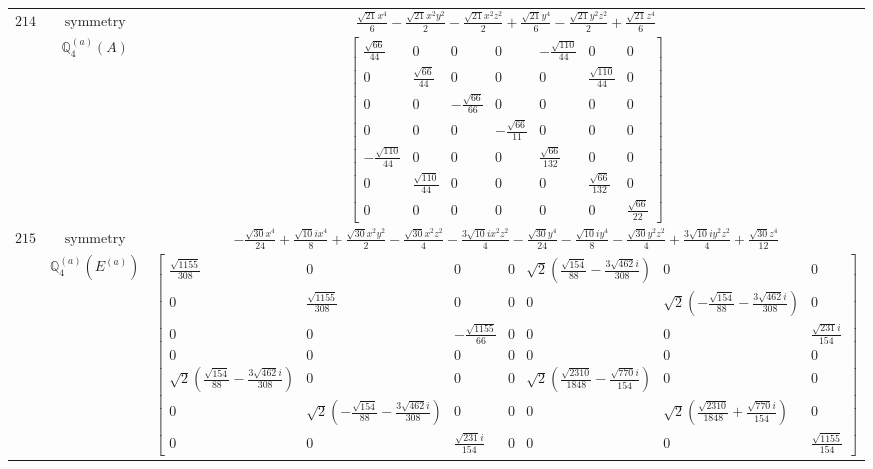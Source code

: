 \documentclass[fleqn,8pt,landscape]{jsarticle}
\begin{document}
\begin{longtable}{ccc}
$ 214 $ & $ \text{symmetry} $ & $ \frac{\sqrt{21} x^{4}}{6} - \frac{\sqrt{21} x^{2} y^{2}}{2} - \frac{\sqrt{21} x^{2} z^{2}}{2} + \frac{\sqrt{21} y^{4}}{6} - \frac{\sqrt{21} y^{2} z^{2}}{2} + \frac{\sqrt{21} z^{4}}{6} $ \\
$  $ & $ \mathbb{Q}_{4}^{(a)}(A) $ & $ \begin{bmatrix} \frac{\sqrt{66}}{44} & 0 & 0 & 0 & - \frac{\sqrt{110}}{44} & 0 & 0 \\ 0 & \frac{\sqrt{66}}{44} & 0 & 0 & 0 & \frac{\sqrt{110}}{44} & 0 \\ 0 & 0 & - \frac{\sqrt{66}}{66} & 0 & 0 & 0 & 0 \\ 0 & 0 & 0 & - \frac{\sqrt{66}}{11} & 0 & 0 & 0 \\ - \frac{\sqrt{110}}{44} & 0 & 0 & 0 & \frac{\sqrt{66}}{132} & 0 & 0 \\ 0 & \frac{\sqrt{110}}{44} & 0 & 0 & 0 & \frac{\sqrt{66}}{132} & 0 \\ 0 & 0 & 0 & 0 & 0 & 0 & \frac{\sqrt{66}}{22} \end{bmatrix} $ \\ \hline
$ 215 $ & $ \text{symmetry} $ & $ - \frac{\sqrt{30} x^{4}}{24} + \frac{\sqrt{10} i x^{4}}{8} + \frac{\sqrt{30} x^{2} y^{2}}{2} - \frac{\sqrt{30} x^{2} z^{2}}{4} - \frac{3 \sqrt{10} i x^{2} z^{2}}{4} - \frac{\sqrt{30} y^{4}}{24} - \frac{\sqrt{10} i y^{4}}{8} - \frac{\sqrt{30} y^{2} z^{2}}{4} + \frac{3 \sqrt{10} i y^{2} z^{2}}{4} + \frac{\sqrt{30} z^{4}}{12} $ \\
$  $ & $ \mathbb{Q}_{4}^{(a)}(E^{(a)}) $ & $ \begin{bmatrix} \frac{\sqrt{1155}}{308} & 0 & 0 & 0 & \sqrt{2} \left(\frac{\sqrt{154}}{88} - \frac{3 \sqrt{462} i}{308}\right) & 0 & 0 \\ 0 & \frac{\sqrt{1155}}{308} & 0 & 0 & 0 & \sqrt{2} \left(- \frac{\sqrt{154}}{88} - \frac{3 \sqrt{462} i}{308}\right) & 0 \\ 0 & 0 & - \frac{\sqrt{1155}}{66} & 0 & 0 & 0 & \frac{\sqrt{231} i}{154} \\ 0 & 0 & 0 & 0 & 0 & 0 & 0 \\ \sqrt{2} \left(\frac{\sqrt{154}}{88} - \frac{3 \sqrt{462} i}{308}\right) & 0 & 0 & 0 & \sqrt{2} \left(\frac{\sqrt{2310}}{1848} - \frac{\sqrt{770} i}{154}\right) & 0 & 0 \\ 0 & \sqrt{2} \left(- \frac{\sqrt{154}}{88} - \frac{3 \sqrt{462} i}{308}\right) & 0 & 0 & 0 & \sqrt{2} \left(\frac{\sqrt{2310}}{1848} + \frac{\sqrt{770} i}{154}\right) & 0 \\ 0 & 0 & \frac{\sqrt{231} i}{154} & 0 & 0 & 0 & \frac{\sqrt{1155}}{154} \end{bmatrix} $ \\ \hline

\end{longtable}
\end{document}
